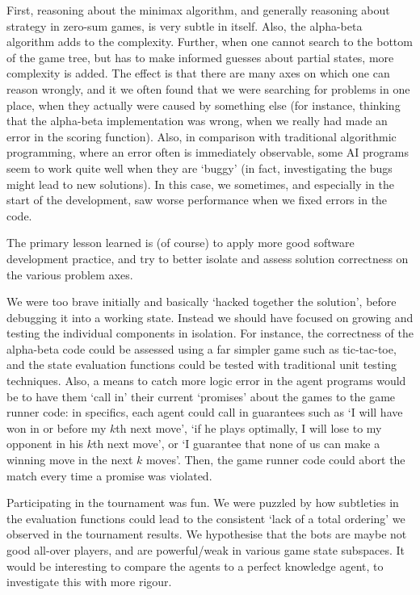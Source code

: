 \documentclass[a4paper,9pt]{article}
\begin{document}
First, reasoning about the minimax algorithm, and generally reasoning about
strategy in zero-sum games, is very subtle in itself. Also, the alpha-beta
algorithm adds to the complexity. Further, when one cannot search to the bottom
of the game tree, but has to make informed guesses about partial states, more
complexity is added. The effect is that there are many axes on which one can
reason wrongly, and it we often found that we were searching for problems in
one place, when they actually were caused by something else (for instance,
thinking that the alpha-beta implementation was wrong, when we really had made
an error in the scoring function). Also, in comparison with traditional
algorithmic programming, where an error often is immediately observable, some
AI programs seem to work quite well when they are `buggy' (in fact,
investigating the bugs might lead to new solutions). In this case, we sometimes,
and especially in the start of the development, saw worse performance when we
fixed errors in the code.

The primary lesson learned is (of course) to apply more good software
development practice, and try to better isolate and assess solution correctness
on the various problem axes. 

We were too brave initially and basically `hacked together the solution',
before debugging it into a working state. Instead we should have focused on
growing and testing the individual components in isolation. For instance, the
correctness of the alpha-beta code could be assessed using a far simpler game
such as tic-tac-toe, and the state evaluation functions could be tested with
traditional unit testing techniques.  Also, a means to catch more logic error
in the agent programs would be to have them `call in' their current `promises'
about the games to the game runner code: in specifics, each agent could call in
guarantees such as `I will have won in or before my $k$th next move', `if he
plays optimally, I will lose to my opponent in his $k$th next move', or `I
guarantee that none of us can make a winning move in the next $k$ moves'. Then,
the game runner code could abort the match every time a promise was violated. 

Participating in the tournament was fun. We were puzzled by how subtleties in
the evaluation functions could lead to the consistent `lack of a total
ordering' we observed in the tournament results. We hypothesise that the bots
are maybe not good all-over players, and are powerful/weak in various game
state subspaces. It would be interesting to compare the agents to a perfect
knowledge agent, to investigate this with more rigour.
\end{document}
